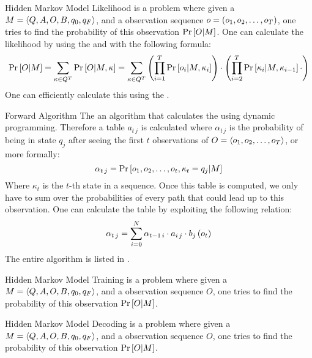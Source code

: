 \begin{df}{Hidden Markov Model Likelihood}
\sb{} is a problem where given a  $M=\left\langle Q,A,O,B,q_0,q_F\right\rangle$, and a observation sequence $o=\left(o_1,o_2,\ldots,o_T\right)$, one tries to find the probability of this observation $\Pr\left[O|M\right]$. One can calculate the likelihood by using the  and  with the following formula:
\begin{equation}
\Pr\left[O|M\right]=\displaystyle\sum_{\kappa\in Q^T}\Pr\left[O|M,\kappa\right]=\displaystyle\sum_{\kappa\in Q^T}\left(\displaystyle\prod_{i=1}^T\Pr\left[o_i|M,\kappa_i\right]\right)\cdot\left(\displaystyle\prod_{i=2}^T\Pr\left[\kappa_i|M,\kappa_{i-1}\right]\cdot\right)
\end{equation}
One can efficiently calculate this using the .
\end{df}
\begin{df}{Forward Algorithm}
The \sb{} an algorithm that calculates the  using dynamic programming. Therefore a table $a_{t\,j}$ is calculated where $\alpha_{t\,j}$ is the probability of being in state $q_j$ after seeing the first $t$ observations of $O=\left\langle o_1,o_2,\ldots,o_T\right\rangle$, or more formally:
\begin{equation}
\alpha_{t\,j}=\Pr\left[o_1,o_2,\ldots,o_t,\kappa_t=q_j|M\right]
\end{equation}
Where $\kappa_t$ is the $t$-th state in a sequence. Once this table is computed, we only have to sum over the probabilities of every path that could lead up to this observation. One can calculate the table by exploiting the following relation:
\begin{equation}
\alpha_{t\,j}=\displaystyle\sum_{i=0}^N\alpha_{t-1\,i}\cdot a_{i\,j}\cdot b_{j}\left(o_t\right)
\end{equation}
The entire algorithm is listed in .
\end{df}
\begin{df}{Hidden Markov Model Training}
\sb{} is a problem where given a  $M=\left\langle Q,A,O,B,q_0,q_F\right\rangle$, and a observation sequence $O$, one tries to find the probability of this observation $\Pr\left[O|M\right]$.
\end{df}
\begin{df}{Hidden Markov Model Decoding}
\sb{} is a problem where given a  $M=\left\langle Q,A,O,B,q_0,q_F\right\rangle$, and a observation sequence $O$, one tries to find the probability of this observation $\Pr\left[O|M\right]$.
\end{df}